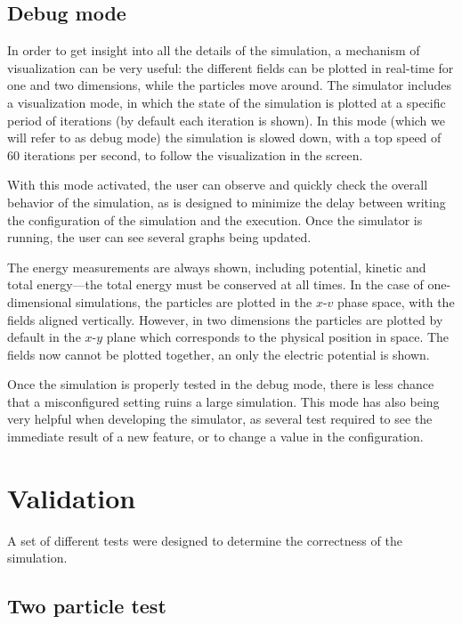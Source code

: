 \subsection{Debug mode}

In order to get insight into all the details of the simulation, a mechanism of 
visualization can be very useful: the different fields can be plotted in 
real-time for one and two dimensions, while the particles move around. The 
simulator includes a visualization mode, in which the state of the simulation is 
plotted at a specific period of iterations (by default each iteration is shown).  
In this mode (which we will refer to as debug mode) the simulation is slowed 
down, with a top speed of 60 iterations per second, to follow the visualization 
in the screen.

With this mode activated, the user can observe and quickly check the overall 
behavior of the simulation, as is designed to minimize the delay between writing 
the configuration of the simulation and the execution. Once the simulator is 
running, the user can see several graphs being updated.

The energy measurements are always shown, including potential, kinetic and total 
energy---the total energy must be conserved at all times. In the case of 
one-dimensional simulations, the particles are plotted in the $x$-$v$ phase 
space, with the fields aligned vertically. However, in two dimensions the 
particles are plotted by default in the $x$-$y$ plane which corresponds to the 
physical position in space. The fields now cannot be plotted together, an only 
the electric potential is shown.


Once the simulation is properly tested in the debug mode, there is less chance 
that a misconfigured setting ruins a large simulation. This mode has also being 
very helpful when developing the simulator, as several test required to see the 
immediate result of a new feature, or to change a value in the configuration.

\section{Validation}

A set of different tests were designed to determine the correctness of the
simulation.

\subsection{Two particle test}

